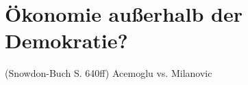 %
%
%

\chapter{Ökonomie außerhalb der Demokratie?}
\label{Demokratie}


(Snowdon-Buch S. 640ff)
Acemoglu vs. Milanovic



